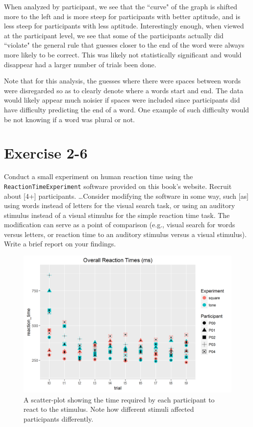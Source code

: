 \documentclass{article}
\begin{document}
When analyzed by participant, we see that the ``curve" of the graph is shifted more to the left and is more steep for participants with better aptitude, and is less steep for participants with less aptitude. Interestingly enough, when viewed at the participant level, we see that some of the participants actually did ``violate" the general rule that guesses closer to the end of the word were always more likely to be correct. This was likely not statistically significant and would disappear had a larger number of trials been done.

Note that for this analysis, the guesses where there were spaces between words were disregarded so as to clearly denote where a words start and end. The data would likely appear much noisier if spaces were included since participants did have difficulty predicting the end of a word. One example of such difficulty would be not knowing if a word was plural or not.

%
%
\section{Exercise 2-6}
Conduct a small experiment on human reaction time using the \texttt{ReactionTimeExperiment} software provided on this book's website. Recruit about [4+] participants. \dots Consider modifying the software in some way, such [as] using words instead of letters for the visual search task, or using an auditory stimulus instead of a visual stimulus for the simple reaction time task. The modification can serve as a point of comparison (e.g., visual search for words versus letters, or reaction time to an auditory stimulus versus a visual stimulus). Write a brief report on your findings. \\

\begin{figure}[h!]
\centering
\includegraphics[width=.65\linewidth]{overall-reaction}
\caption{A scatter-plot showing the time required by each participant to react to the stimulus. Note how different stimuli affected participants differently.}
\label{fig:overall-reaction}
\end{figure}
\end{document}
